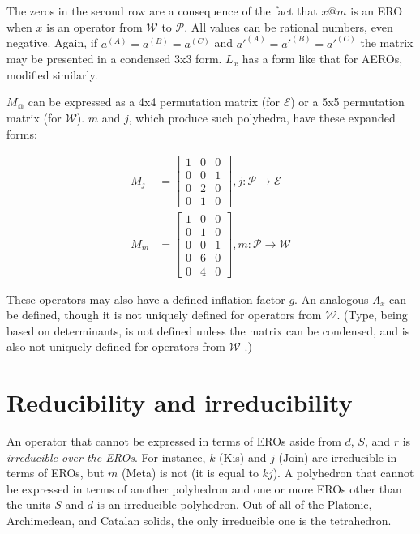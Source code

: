\documentclass[12pt]{amsart}%
\begin{document}
The zeros in the second row are a consequence of the fact that $x@m$ is an ERO
when $x$ is an operator from $\mathcal{W}$ to $\mathcal{P}$. All values can be
rational numbers, even negative. Again, if $a^{(A)} = a^{(B)} = a^{(C)}$ and
$a'^{(A)} = a'^{(B)} = a'^{(C)}$ the matrix may be presented in a condensed 3x3
form. $L_x$ has a form like that for AEROs, modified similarly.

$M_@$ can be expressed as a 4x4 permutation matrix (for $\mathcal{E}$)
or a 5x5 permutation matrix (for $\mathcal{W}$). $m$ and $j$,
which produce such polyhedra, have these expanded forms:

\begin{equation}
  \begin{split}
  M_j &= \begin{bmatrix}
  1 & 0 & 0 \\
  0 & 0 & 1 \\
  0 & 2 & 0 \\
  0 & 1 & 0 \end{bmatrix}, j: \mathcal{P} \to \mathcal{E} \\
  M_m &= \begin{bmatrix}
  1 & 0 & 0 \\
  0 & 1 & 0 \\
  0 & 0 & 1 \\
  0 & 6 & 0 \\
  0 & 4 & 0 \end{bmatrix}, m: \mathcal{P} \to \mathcal{W}
  \end{split}
\end{equation}

These operators may also have a defined inflation factor $g$.
An analogous $\Lambda_x$ can be defined, though it is not uniquely
defined for operators from $\mathcal{W}$. (Type, being based on determinants,
is not defined unless the matrix can be condensed,
and is also not uniquely defined for operators from $\mathcal{W}$ .)

\section{Reducibility and irreducibility}
An operator that cannot be expressed in terms of EROs aside from $d$, $S$, and
$r$ is \textit{irreducible over the EROs}. For instance, $k$ (Kis) and $j$
(Join) are irreducible in terms of EROs, but $m$ (Meta) is not (it is equal to
$kj$). A polyhedron that cannot be expressed in terms of another polyhedron and
one or more EROs other than the units $S$ and $d$ is an irreducible polyhedron.
Out of all of the Platonic, Archimedean, and Catalan solids, the only
irreducible one is the tetrahedron.
\end{document}
